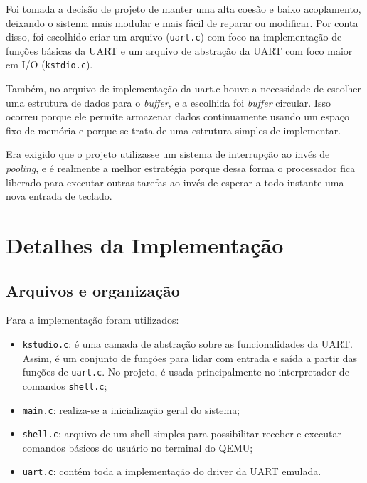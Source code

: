     Foi tomada a decisão de projeto de manter uma alta coesão e baixo acoplamento, deixando o sistema mais modular e mais fácil de reparar ou modificar. Por conta disso, foi escolhido criar um arquivo (\texttt{uart.c}) com foco na implementação de funções básicas da UART e um arquivo de abstração da UART com foco maior em I/O (\texttt{kstdio.c}).

    Também, no arquivo de implementação da uart.c houve a necessidade de escolher uma estrutura de dados para o \textit{buffer}, e a escolhida foi \textit{buffer} circular. Isso ocorreu porque ele permite armazenar dados continuamente usando um espaço fixo de memória e porque se trata de uma estrutura simples de implementar.

    Era exigido que o projeto utilizasse um sistema de interrupção ao invés de \textit{pooling}, e é realmente a melhor estratégia porque dessa forma o processador fica liberado para executar outras tarefas ao invés de esperar a todo instante uma nova entrada de teclado.
    




\section{Detalhes da Implementação}


\subsection{Arquivos e organização}

Para a implementação foram utilizados:

\begin{itemize}
    
    \item \texttt{kstudio.c}: é uma camada de abstração sobre as funcionalidades da UART. Assim, é um conjunto de funções para lidar com entrada e saída a partir das funções de \texttt{uart.c}. No projeto, é usada principalmente no interpretador de comandos \texttt{shell.c};
    
    \item \texttt{main.c}: realiza-se a inicialização geral do sistema;
    
    \item \texttt{shell.c}: arquivo de um shell simples para possibilitar receber e executar comandos básicos do usuário no terminal do QEMU;
    
    \item \texttt{uart.c}: contém toda a implementação do driver da UART emulada.
\end{itemize}

